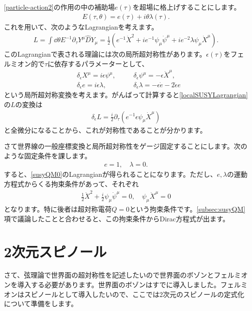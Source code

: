 \documentclass[report,paper=a4, fontsize=12pt, line_length=16cm, number_of_lines=33,dvipdfmx]{jlreq}
\numberwithin{equation}{chapter}
\numberwithin{equation}{section}
\newcommand{\del}{\partial}
\newcommand{\Dh}{\widehat{D}}
\begin{document}
\eqref{particle-action2}の作用の中の補助場$e(\tau)$を超場に格上げすることにします。
\begin{align}
  E(\tau,\theta)=e(\tau)+i\theta \lambda(\tau).
\end{align}
これを用いて、次のようなLagrangianを考えます。
\begin{align}
  L=\int \dd{\theta} E^{-1}\del_{\tau}Y^{\mu}\Dh Y_{\mu}
=\frac12(e^{-1}\dot{X}^2+ie^{-1}\psi_{\mu}\dot{\psi}^{\mu}+ie^{-2}\lambda \psi_{\mu}\dot{X}^{\mu}).\label{localSUSYLagrangian}
\end{align}
このLagrangianで表される理論には次の局所超対称性があります。$\epsilon(\tau)$をフェルミオン的で$\tau$に依存するパラメーターとして、
\begin{align}
  &\delta_{\epsilon}X^{\mu}=i\epsilon \psi^{\mu},\quad
  &&\delta_{\epsilon}\psi^{\mu}=-\epsilon \dot{X}^{\mu},\\
  &\delta_{\epsilon}e = i\epsilon \lambda,
  && \delta_{\epsilon}\lambda = -\epsilon \dot{e}-2 \dot{\epsilon} e
\end{align}
という局所超対称変換を考えます。がんばって計算すると\eqref{localSUSYLagrangian}の$L$の変換は
\begin{align}
  \delta_{\epsilon}L=\frac{i}{2}\del_{\tau}(e^{-1}\epsilon \psi_{\mu}\dot{X}^{\mu})
\end{align}
と全微分になることから、これが対称性であることが分かります。

さて世界線の一般座標変換と局所超対称性をゲージ固定することにします。次のような固定条件を課します。
\begin{align}
  e=1,\quad \lambda=0.
\end{align}
すると、\eqref{susyQM0}のLagrangianが得られることになります。ただし、$e,\lambda$の運動方程式からくる拘束条件があって、それぞれ
\begin{align}
  \frac12\dot{X}^2+\frac{i}{2} \psi_{\mu}\dot{\psi}^{\mu}=0,\quad \psi_{\mu}\dot{X}^{\mu}=0
\end{align}
となります。特に後者は超対称電荷$Q=0$という拘束条件です。\ref{subsec:susyQM}項で議論したことと合わせると、この拘束条件からDirac方程式が出ます。

\section{2次元スピノール}
さて、弦理論で世界面の超対称性を記述したいので世界面のボゾンとフェルミオンを導入する必要があります。世界面のボゾンはすでに導入しました。フェルミオンはスピノールとして導入したいので、ここでは2次元のスピノールの定式化について準備をします。
\end{document}
